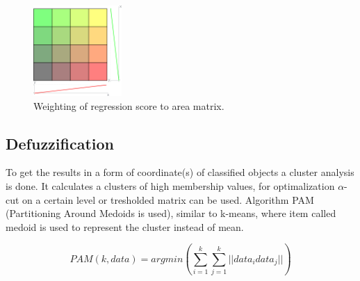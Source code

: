 \begin{figure}[h!]
\begin{center}
\includegraphics[width=0.3\textwidth]{img/pir_area.png}
\caption{Weighting of regression score to area matrix.\label{fig:areamatrixweighting}}
\end{center}
\end{figure}


\subsection*{Defuzzification}

To get the results in a form of coordinate(s) of classified objects a cluster analysis is done. It calculates
a clusters of high membership values, for optimalization $\alpha$-cut on a certain level or tresholded
matrix can be used. Algorithm PAM (Partitioning Around Medoids is used), similar to k-means, where item called
medoid is used to represent the cluster instead of mean.

\begin{equation}
\mathit{PAM}(k, data) = argmin \left( \sum_{i=1}^{k} \sum_{j=1}^{k} ||data_{i} data_{j}||  \right)
\end{equation}


